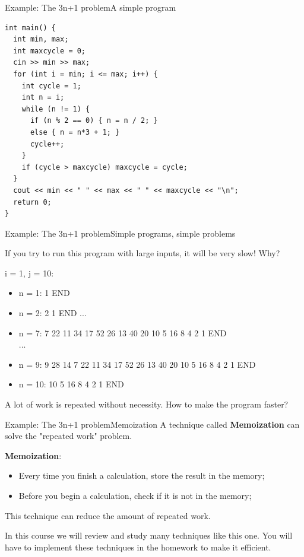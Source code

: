 \begin{frame}[fragile]{Example: The 3n+1 problem}{A simple program}
{\smaller
\begin{verbatim}
int main() {
  int min, max;
  int maxcycle = 0;
  cin >> min >> max;
  for (int i = min; i <= max; i++) {
    int cycle = 1;
    int n = i;
    while (n != 1) {
      if (n % 2 == 0) { n = n / 2; }
      else { n = n*3 + 1; }
      cycle++;
    }
    if (cycle > maxcycle) maxcycle = cycle;
  }
  cout << min << " " << max << " " << maxcycle << "\n";
  return 0;
}
\end{verbatim}}
\end{frame}

\begin{frame}{Example: The 3n+1 problem}{Simple programs, simple
  problems}

If you try to run this program with large inputs, it will be very slow! Why?
\bigskip

i = 1, j = 10:
\begin{itemize}
  \item n = 1: 1 END
  \item n = 2: 2 1 END
  ...
  \item n = 7: 7 22 11 34 17 52 26 13 40 20 10 5 16 8 4 2 1 END\\
  ...
  \item n = 9: 9 28 14 \alert{7 22 11 34 17 52 26 13 40 20 10 5 16 8 4 2 1 END}
  \item n = 10: \alert{10 5 16 8 4 2 1 END}
\end{itemize}
\bigskip

A lot of work is repeated without necessity. How to make the program faster?
\end{frame}

\begin{frame}{Example: The 3n+1 problem}{Memoization}
  A technique called {\bf Memoization} can solve the "repeated work" problem.
  \bigskip

  {\bf Memoization}:
  \begin{itemize}
    \item Every time you finish a calculation, store the result in the memory;
    \item Before you begin a calculation, check if it is not in the memory;
  \end{itemize}
  \bigskip

  This technique can reduce the amount of repeated work.
  \bigskip

  In this course we will review and study many techniques like this one. You will have to implement these techniques in the homework to make it efficient.
\end{frame}

